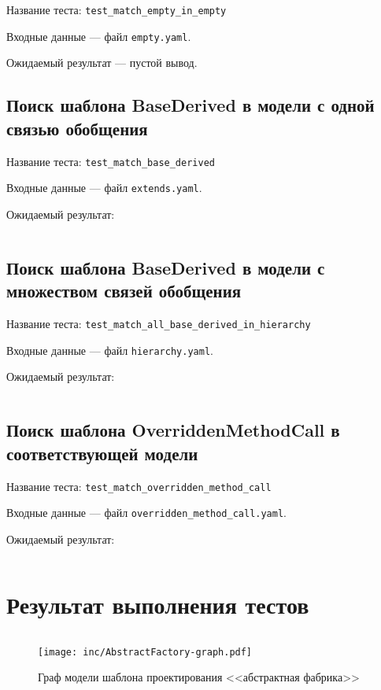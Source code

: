 Название теста: \verb;test_match_empty_in_empty;

Входные данные --- файл \verb;empty.yaml;.

Ожидаемый результат --- пустой вывод.

\subsection*{Поиск шаблона BaseDerived в модели с одной связью обобщения}

Название теста: \verb;test_match_base_derived;

Входные данные --- файл \verb;extends.yaml;.

Ожидаемый результат:

\inputminted{text}{../src/test/data/match/base_derived_in_extends.log}

\subsection*{Поиск шаблона BaseDerived в модели с множеством связей обобщения}

Название теста: \verb;test_match_all_base_derived_in_hierarchy;

Входные данные --- файл \verb;hierarchy.yaml;.

Ожидаемый результат:

\inputminted{text}{../src/test/data/match/all_base_derived_in_hierarchy.log}

\subsection*{Поиск шаблона OverriddenMethodCall в соответствующей модели}

Название теста: \verb;test_match_overridden_method_call;

Входные данные --- файл \verb;overridden_method_call.yaml;.

Ожидаемый результат:

\inputminted{text}{../src/test/data/match/overridden_method_call.log}

\section*{Результат выполнения тестов}

\inputminted{text}{inc/match_pattern_test.log}


\begin{figure}[!ht]
\centering
\texttt{[image: inc/AbstractFactory-graph.pdf]}
\caption{Граф модели шаблона проектирования <<абстрактная фабрика>>}
\label{fig:AbstractFactory-graph}
\end{figure}

